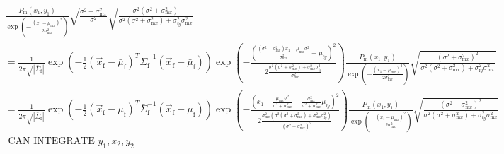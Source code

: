\documentclass{article}
\newcommand{\x}[1]{\text{#1}}
\begin{document}
\begin{landscape}
\begin{align*}
\\&\frac{P_\x{m}(x_1,y_1)}{\exp\left(-\frac{(x_1-\mu_{\x{m}x})^2}{2\sigma_{\x{m}x}^2}\right)}\sqrt{\frac{\sigma^2+\sigma_{\x{m}x}^2}{\sigma^2}}\sqrt{\frac{\sigma^2(\sigma^2+\sigma_{\x{m}x}^2)}{\sigma^2(\sigma^2+\sigma_{\x{m}x}^2)+\sigma_{\x{f}y}^2\sigma_{\x{m}x}^2}}
\\&=\frac{1}{2\pi\sqrt{|\bar{\Sigma}_{\x{f}}|}}\exp\left(-\frac{1}{2}(\vec{x}_\x{f}-\bar{\mu}_{\x{f}})^T\bar{\Sigma}_\x{f}^{-1}(\vec{x}_\x{f}-\bar{\mu}_\x{f})\right)\exp\left(-\frac{\left(\frac{(\sigma^2+\sigma_{\x{m}x}^2)x_1-\mu_{\x{m}x}\sigma^2}{\sigma_{\x{m}x}^2}-\mu_{\x{f}y}\right)^2}{2\frac{\sigma^2(\sigma^2+\sigma_{\x{m}x}^2)+\sigma_{\x{m}x}^2\sigma_{\x{f}y}^2}{\sigma_{\x{m}x}^2}}\right)\frac{P_\x{m}(x_1,y_1)}{\exp\left(-\frac{(x_1-\mu_{\x{m}x})^2}{2\sigma_{\x{m}x}^2}\right)}\sqrt{\frac{(\sigma^2+\sigma_{\x{m}x}^2)^2}{\sigma^2(\sigma^2+\sigma_{\x{m}x}^2)+\sigma_{\x{f}y}^2\sigma_{\x{m}x}^2}}
\\&=\frac{1}{2\pi\sqrt{|\bar{\Sigma}_{\x{f}}|}}\exp\left(-\frac{1}{2}(\vec{x}_\x{f}-\bar{\mu}_{\x{f}})^T\bar{\Sigma}_\x{f}^{-1}(\vec{x}_\x{f}-\bar{\mu}_\x{f})\right)\exp\left(-\frac{\left(x_1-\frac{\mu_{\x{m}x}\sigma^2}{\sigma^2+\sigma_{\x{m}x}^2}-\frac{\sigma_{\x{m}x}^2}{\sigma^2+\sigma_{\x{m}x}^2}\mu_{\x{f}y}\right)^2}{2\frac{\sigma_{\x{m}x}^2(\sigma^2(\sigma^2+\sigma_{\x{m}x}^2)+\sigma_{\x{m}x}^2\sigma_{\x{f}y}^2)}{(\sigma^2+\sigma_{\x{m}x}^2)^2}}\right)\frac{P_\x{m}(x_1,y_1)}{\exp\left(-\frac{(x_1-\mu_{\x{m}x})^2}{2\sigma_{\x{m}x}^2}\right)}\sqrt{\frac{(\sigma^2+\sigma_{\x{m}x}^2)^2}{\sigma^2(\sigma^2+\sigma_{\x{m}x}^2)+\sigma_{\x{f}y}^2\sigma_{\x{m}x}^2}} 
\\&\text{ CAN INTEGRATE } y_1,x_2,y_2
\end{align*}


\end{landscape}
\end{document}

